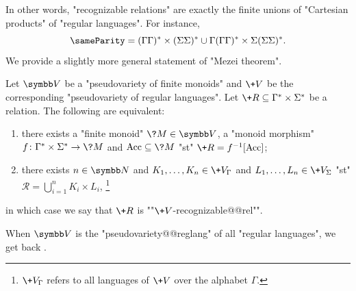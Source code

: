 In other words, "recognizable relations" are exactly the finite unions of
"Cartesian products" of "regular languages".
For instance, \[{\sameParity} =
(\Gamma\Gamma)^* \times (\Sigma\Sigma)^*
\cup \Gamma(\Gamma\Gamma)^* \times \Sigma(\Sigma\Sigma)^*.\]
We provide a slightly more general statement of "Mezei theorem".

\begin{proposition}
	\label{prop:Mezei-theorem-generalization}
	Let $\B{V}$ be a "pseudovariety of finite monoids"
	and $\+V$ be the corresponding "pseudovariety of regular languages".
	Let $\+R \subseteq \Gamma^* \times \Sigma^*$ be a relation.
	The following are equivalent:
	\begin{enumerate}
		\item there exists a "finite monoid" $\?M \in \B{V}$, a "monoid morphism"
		$f\colon \Gamma^* \times \Sigma^* \to \?M$ and $\Acc \subseteq \?M$
		"st" $\+R = f^{-1}[\Acc]$;
		\item there exists $n \in \N$
		and $K_1,\dotsc,K_n \in \+V_{\Gamma}$ and $L_1,\dotsc,L_n \in \+V_{\Sigma}$
		"st" $\mathcal{R} = \bigcup_{i=1}^n K_i \times L_i$,%
		\footnote{$\+V_{\Gamma}$ refers to all languages of $\+V$ over the alphabet $\Gamma$.}
	\end{enumerate}
	in which case we say that $\+R$ is \AP""$\+V$-recognizable@@rel"".
\end{proposition}

When $\B{V}$ is the "pseudovariety@@reglang" of all "regular languages",
we get back .

